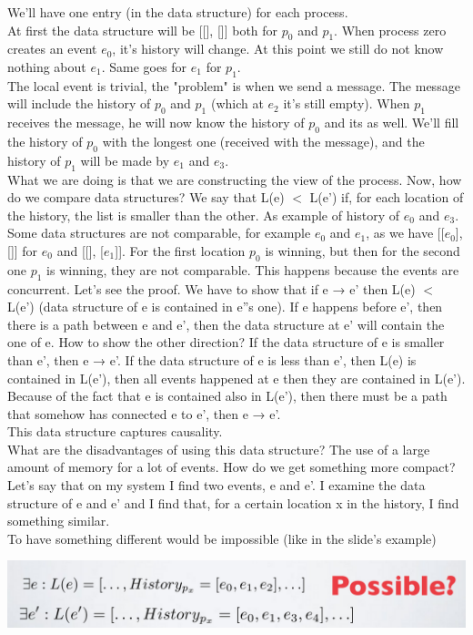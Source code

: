 \documentclass[11pt, a4paper]{article}
\begin{document}
We'll have one entry (in the data structure) for each process.\\
At first the data structure will be [[], []] both for $p_0$ and $p_1$. When process zero
creates an event $e_0$, it's history will change. At this point we still do not know
nothing about $e_1$. Same goes for $e_1$ for $p_1$.\\
The local event is trivial, the "problem" is when we send a message. The message
will include the history of $p_0$ and $p_1$ (which at $e_2$ it's still empty). When $p_1$ receives
the message, he will now know the history of $p_0$ and its as well. We'll fill the
history of $p_0$ with the longest one (received with the message), and the history of
$p_1$ will be made by $e_1$ and $e_3$.\\
What we are doing is that we are constructing the view of the process. Now, how
do we compare data structures? We say that L(e) $<$ L(e') if, for each location of
the history, the list is smaller than the other. As example of history of $e_0$ and $e_3$.
Some data structures are not comparable, for example $e_0$ and $e_1$, as we have
[[$e_0$], []] for $e_0$ and [[], [$e_1$]]. For the first location $p_0$ is winning, but then for the
second one $p_1$ is winning, they are not comparable. This happens because the
events are concurrent.
Let's see the proof.
We have to show that if e → e' then L(e) $<$ L(e') (data structure of e is contained
in e''s one). If e happens before e', then there is a path between e and e', then the
data structure at e' will contain the one of e.
How to show the other direction? If the data structure of e is smaller than e', then
e → e'. If the data structure of e is less than e', then L(e) is contained in L(e'),
then all events happened at e then they are contained in L(e'). Because of the fact
that e is contained also in L(e'), then there must be a path that somehow has
connected e to e', then e → e'.\\
This data structure captures causality.\\
What are the disadvantages of using this data structure? The use of a large
amount of memory for a lot of events. How do we get something more compact?
Let's say that on my system I find two events, e and e'. I examine the data
structure of e and e' and I find that, for a certain location x in the history, I find
something similar.\\
To have something different would be impossible (like in the slide's example)\\
\begin{center}
    \includegraphics[scale=0.5]{img/logical time/ex4.png}
\end{center}
\end{document}
